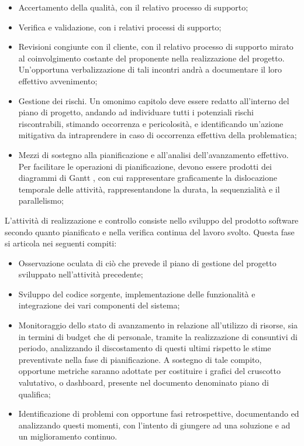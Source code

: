 \begin{enumerate}
\begin{itemize}
        \item Accertamento della qualità, con il relativo processo di supporto;
        \item Verifica e validazione, con i relativi processi di supporto;
        \item Revisioni congiunte con il cliente, con il relativo processo di supporto mirato al coinvolgimento costante del proponente nella realizzazione del progetto. Un’opportuna verbalizzazione di tali incontri andrà a documentare il loro effettivo avvenimento;
        \item Gestione dei rischi. Un omonimo capitolo deve essere redatto all’interno del piano di progetto, andando ad individuare tutti i potenziali rischi riscontrabili, stimando occorrenza e pericolosità, e identificando un’azione mitigativa da intraprendere in caso di occorrenza effettiva della problematica;
        \item Mezzi di sostegno alla pianificazione e all’analisi dell’avanzamento effettivo. Per facilitare le operazioni di pianificazione, devono essere prodotti dei diagrammi di Gantt , con cui rappresentare graficamente la dislocazione temporale delle attività, rappresentandone la durata, la sequenzialità e il parallelismo;
    \end{itemize}
\end{enumerate}

L'attività di realizzazione e controllo consiste nello sviluppo del prodotto software secondo quanto pianificato e nella verifica continua del lavoro svolto. Questa fase si articola nei seguenti compiti:
\begin{itemize}
    \item Osservazione oculata di ciò che prevede il piano di gestione del progetto sviluppato nell’attività precedente;
    \item Sviluppo del codice sorgente, implementazione delle funzionalità e integrazione dei vari componenti del sistema;
    \item Monitoraggio dello stato di avanzamento in relazione all’utilizzo di risorse, sia in termini di budget che di personale, tramite la realizzazione di consuntivi di periodo, analizzando il discostamento di questi ultimi rispetto le stime preventivate nella fase di pianificazione. A sostegno di tale compito, opportune metriche saranno adottate per costituire i grafici del cruscotto valutativo, o dashboard, presente nel documento denominato piano di qualifica;
    \item Identificazione di problemi con opportune fasi retrospettive, documentando ed analizzando questi momenti, con l’intento di giungere ad una soluzione e ad un miglioramento continuo.
\end{itemize}

